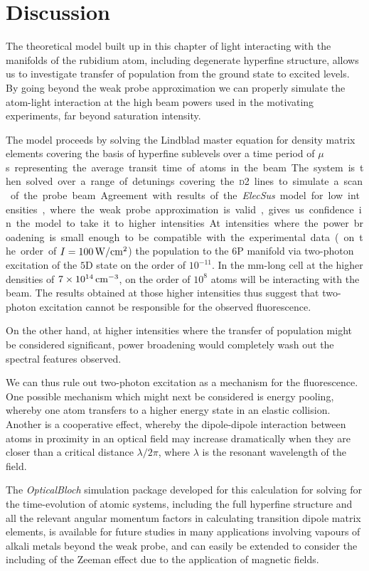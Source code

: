 \section{Discussion}
  \label{sec:twophoton_discussion}

  The theoretical model built up in this chapter of light interacting with the
  manifolds of the rubidium atom, including degenerate hyperfine structure,
  allows us to investigate transfer of population from the ground state to
  excited levels. By going beyond the weak probe approximation we can properly
  simulate the atom-light interaction at the high beam powers used in the
  motivating experiments, far beyond saturation intensity.

  The model proceeds by solving the Lindblad master equation for density matrix
  elements covering the basis of hyperfine sublevels over a time period of
  \unit[2]{$\mu $s} representing the average transit time of atoms in the beam.
  The system is then solved over a range of detunings covering the \textsc{d2}
  lines to simulate a scan of the probe beam.

  Agreement with results of the \textit{ElecSus} model for low intensities,
  where the weak probe approximation is valid, gives us confidence in the model
  to take it to higher intensities. At intensities where the power broadening is
  small enough to be compatible with the experimental data (on the order of $I =
  \unit[100]{W/cm^2}$) the population to the $6$P manifold via two-photon
  excitation of the $5$D state on the order of $10^{-11}$. In the
  \unit[2]{mm}-long cell at the higher densities of
  $\unit[7\times10^{14}]{cm^{-3}}$, on the order of $10^{8}$ atoms will be
  interacting with the beam. The results obtained at those higher intensities
  thus suggest that two-photon excitation cannot be responsible for the observed
  fluorescence.

  On the other hand, at higher intensities where the transfer of
  population might be considered significant, power broadening would completely
  wash out the spectral features observed.

  We can thus rule out two-photon excitation as a mechanism for the
  fluorescence. One possible mechanism which might next be considered is energy
  pooling, whereby one atom transfers to a higher energy state in an elastic
  collision\cite{Namiotka1997,Bearman1978}. Another is a cooperative
  effect\cite{Bettles2016,Bettles2015}, whereby the dipole-dipole interaction
  between atoms in proximity in an optical field may increase dramatically when
  they are closer than a critical distance $\lambda/2\pi$, where $\lambda$ is
  the resonant wavelength of the field.

  The \textit{OpticalBloch} simulation package developed for this calculation
  for solving for the time-evolution of atomic systems, including the full
  hyperfine structure and all the relevant angular momentum factors in
  calculating transition dipole matrix elements, is available for future studies
  in many applications involving vapours of alkali metals beyond the weak probe,
  and can easily be extended to consider the including of the Zeeman effect due
  to the application of magnetic fields.
